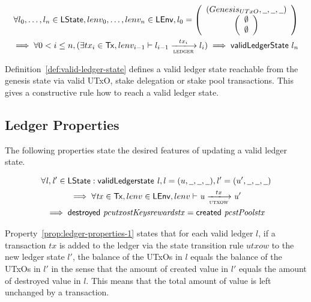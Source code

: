 \begin{definition}
  \begin{multline*}
    \forall l_{0},\ldots,l_{n} \in \LState, lenv_{0},\ldots,lenv_{n} \in \LEnv,
    l_{0} = \left(
      \begin{array}{c}
        \genesisUTxOState \\
        \left(
        \begin{array}{c}
          \emptyset\\
          \emptyset
        \end{array}
        \right)
      \end{array}
    \right)  \\
    \implies \forall 0 < i \leq n, (\exists tx_{i} \in \Tx,
    lenv_{i-1}\vdash l_{i-1} \trans{ledger}{tx_{i}} l_{i}) \implies
    \applyFun{validLedgerState} l_{n}
  \end{multline*}
  \label{def:valid-ledger-state}
\end{definition}

Definition~\ref{def:valid-ledger-state} defines a valid ledger state reachable
from the genesis state via valid UTxO, stake delegation or stake pool
transactions. This gives a constructive rule how to reach a valid ledger state.

\subsection{Ledger Properties}
\label{sec:ledger-properties}

The following properties state the desired features of updating a valid ledger
state.

\begin{property}
  \begin{multline*}
    \forall \var{l}, \var{l'} \in \LState: \applyFun{validLedgerstate}{l},
    l=(u,\wcard,\wcard,\wcard), l' = (u',\wcard,\wcard,\wcard)\\
    \implies \forall \var{tx} \in \Tx, lenv \in\LEnv, lenv \vdash\var{u} \trans{utxow}{tx} \var{u'} \\
    \implies \applyFun{destroyed}{pc utxo stKeys rewards tx} =
    \applyFun{created}{pc stPools tx}
  \end{multline*}
  \label{prop:ledger-properties-1}
\end{property}

Property~\ref{prop:ledger-properties-1} states that for each valid ledger $l$,
if a transaction $tx$ is added to the ledger via the state transition rule
$utxow$ to the new ledger state $l'$, the balance of the UTxOs in $l$ equals the
balance of the UTxOs in $l'$ in the sense that the amount of created value in
$l'$ equals the amount of destroyed value in $l$. This means that the total
amount of value is left unchanged by a transaction.

